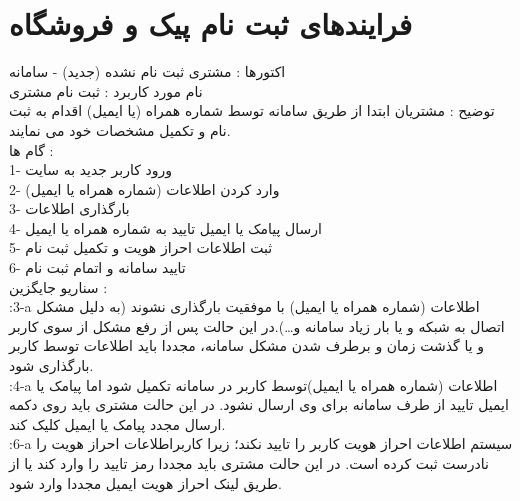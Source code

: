 \documentclass[14pt]{article}
\begin{document}
 
\section{ فرایندهای ثبت نام پیک و فروشگاه}
اکتورها : مشتری ثبت نام نشده (جدید) - سامانه\\
نام مورد کاربرد : ثبت نام مشتری \\
توضیح : مشتریان ابتدا از طریق سامانه توسط شماره همراه (یا ایمیل) اقدام به ثبت نام و تکمیل مشخصات خود می نمایند.\\
گام ها :\\
1- ورود کاربر جدید به سایت\\
2-  وارد کردن اطلاعات (شماره همراه یا ایمیل) \\
3- بارگذاری اطلاعات \\
4- ارسال پیامک یا ایمیل تایید به شماره همراه یا ایمیل \\
5- ثبت اطلاعات احراز هویت و تکمیل ثبت نام \\
6- تایید سامانه و اتمام ثبت نام \\
سناریو جایگزین : \\
:3-a اطلاعات (شماره همراه یا ایمیل) با موفقیت بارگذاری نشوند (به دلیل مشکل اتصال به شبکه و یا بار زیاد سامانه و…).در این حالت پس از رفع مشکل از سوی کاربر و یا گذشت زمان و برطرف شدن مشکل سامانه، مجددا باید اطلاعات توسط کاربر بارگذاری شود.\\
:4-a اطلاعات (شماره همراه یا ایمیل)توسط کاربر در سامانه تکمیل شود اما پیامک یا ایمیل تایید از طرف سامانه برای وی ارسال نشود. در این حالت مشتری باید روی دکمه ارسال مجدد پیامک یا ایمیل کلیک کند.\\
:6-a سیستم اطلاعات احراز هویت کاربر را تایید نکند؛ زیرا کاربراطلاعات احراز هویت را نادرست ثبت کرده است. در این حالت مشتری باید مجددا رمز تایید را وارد کند یا از طریق لینک احراز هویت ایمیل مجددا وارد شود.\\
\end{document}
